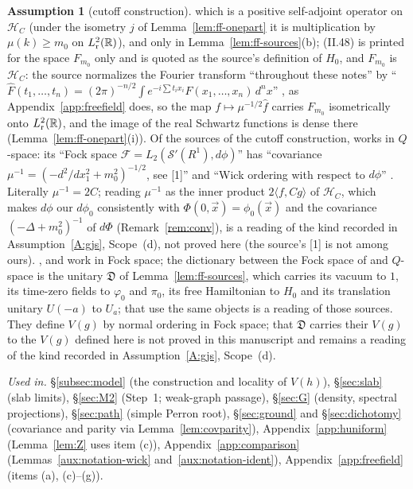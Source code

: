 \documentclass[11pt,a4paper]{article}
\theoremstyle{plain}
\theoremstyle{definition}
\newtheorem{assumption}{Assumption}
\theoremstyle{plain}
\theoremstyle{definition}
\newcommand{\R}{\mathbb{R}}
\newcommand{\HH}{\mathcal{H}}
\newcommand{\ip}[2]{\langle #1,#2\rangle}
\begin{document}
\begin{assumption}[cutoff construction]
which is a positive self-adjoint operator on $\HH_C$ (under the isometry $j$ of
Lemma~\ref{lem:ff-onepart} it is multiplication by $\mu(k)\ge m_0$ on $L^2_{\rm r}(\R)$), and
only in Lemma~\ref{lem:ff-sources}(b); (II.48) is printed for the space $F_{m_0}$ only and is
quoted as the source's definition of $H_0$, and $F_{m_0}$ is $\HH_C$: the source normalizes the
Fourier transform ``throughout these notes'' by ``$\hat F(t_1,\dots,t_n)=(2\pi)^{-n/2}\int
e^{-i\sum t_ix_i}F(x_1,\dots,x_n)\,d^nx$'' \cite[p.~27]{SimonBook}, as
Appendix~\ref{app:freefield} does, so the map $f\mapsto\mu^{-1/2}\hat f$ carries $F_{m_0}$
isometrically onto $L^2_{\rm r}(\R)$, and the image of the real Schwartz functions is dense
there (Lemma~\ref{lem:ff-onepart}(i)).  Of the sources of the cutoff construction,
\cite{GJS} works in $Q$-space: its ``Fock space $\mathcal F=L_2(\mathcal S'(R^1),d\phi)$'' has ``covariance
$\mu^{-1}=(-d^2/dx_1^2+m_0^2)^{-1/2}$, see [1]'' and ``Wick ordering with respect to
$d\phi$'' \cite[p.~588]{GJS}.  Literally $\mu^{-1}=2C$; reading $\mu^{-1}$ as the inner product
$2\ip f{Cg}$ of $\HH_C$, which makes $d\phi$ our $d\phi_0$ consistently with
$\Phi(0,\vec x)=\phi_0(\vec x)$ and the covariance $(-\Delta+m_0^2)^{-1}$ of $d\Phi$
\cite[p.~589]{GJS} (Remark~\ref{rem:conv}), is a reading of the kind recorded in
Assumption~\ref{A:gjs}, Scope~(d), not proved here (the source's [1] is not among ours).
\cite[p.~364]{GJ2}, \cite[p.~255]{GJ71} and \cite[p.~158]{Rosen70} work in Fock space; the
dictionary between the Fock space of \cite{GJ2} and $Q$-space is the unitary $\mathfrak D$ of
Lemma~\ref{lem:ff-sources}, which carries its vacuum to $1$, its time-zero fields to
$\varphi_0$ and $\pi_0$, its free Hamiltonian to $H_0$ and its translation unitary $U(-a)$
to $U_a$; that \cite{GJ71,Rosen70} use the same objects is a reading of those sources.
They define $V(g)$ by normal ordering in Fock space; that $\mathfrak D$ carries their $V(g)$
to the $V(g)$ defined here is not proved in this manuscript and remains a reading of the kind
recorded in Assumption~\ref{A:gjs}, Scope~(d).

\emph{Used in.} \S\ref{subsec:model} (the construction and locality of $V(h)$),
\S\ref{sec:slab} (slab limits), \S\ref{sec:M2} (Step~1; weak-graph passage),
\S\ref{sec:G} (density, spectral projections), \S\ref{sec:path} (simple Perron root),
\S\ref{sec:ground} and \S\ref{sec:dichotomy} (covariance and parity via
Lemma~\ref{lem:covparity}), Appendix~\ref{app:huniform} (Lemma~\ref{lem:Z} uses item (c)),
Appendix~\ref{app:comparison} (Lemmas~\ref{aux:notation-wick} and~\ref{aux:notation-ident}),
Appendix~\ref{app:freefield} (items (a), (c)--(g)).


\end{assumption}
\end{document}
